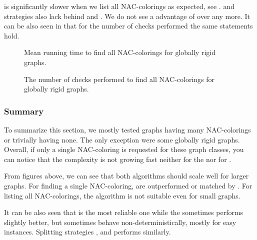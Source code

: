 \NaiveCycles{} is significantly slower when we list all NAC-colorings
as expected, see .
\None{} and \CycleMask{} strategies also lack behind \Neighbors{} and \NeighborsDegree{}.
We do not see a advantage of \MergeLinear{} over \SharedVertices{} any more.
%
It can be also seen in 
that for the number of checks performed the same statements hold.
%
\begin{figure}[thbp]
	\centering
	\scalebox{\BenchFigureScale}{}
	\caption[Mean runtime for globally rigid graphs (all)]{
		Mean running time to find all NAC-colorings for globally rigid graphs.}%
	\label{fig:graph_globally_rigid_all_runtime}
\end{figure}%
\begin{figure}[thbp]
	\centering
	\scalebox{\BenchFigureScale}{}
	\caption[Checks performed for globally rigid graphs (all)]{
		The number of checks performed to find all NAC-colorings for globally rigid graphs.}%
	\label{fig:graph_globally_rigid_all_checks}
\end{figure}%



\subsubsection*{Summary}

To summarize this section, we mostly tested graphs having many NAC-colorings
or trivially having none.
The only exception were some globally rigid graphs.
%
Overall, if only a single NAC-coloring is requested
for these graph classes, you can notice that the complexity
is not growing fast neither for the \NaiveCycles{} nor for \Subgraphs{}.

From figures above, we can see that both algorithms should scale well for larger graphs.
For finding a single NAC-coloring, \Subgraphs{} are outperformed or matched by \NaiveCycles{}.
For listing all NAC-colorings, the \NaiveCycles{} algorithm
is not suitable even for small graphs.

It can be also seen that \MergeLinear{} is the most reliable one
while the \SharedVertices{} sometimes performs slightly better,
but sometimes behave non-deterministically, mostly for easy instances.
%
Splitting strategies \None{}, \Neighbors{} and \NeighborsDegree{}
performs similarly.


